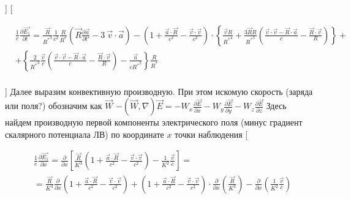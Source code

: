 \documentclass[11pt]{article}
\begin{document}
{]} {[}

\begin{align}
  & \frac{1}{e}\frac{\partial \overrightarrow{{{E}_{1}}}}{\partial t}=\frac{\overrightarrow{R}}{{{R}^{*}}^{3}}\frac{1}{{{c}^{2}}}\frac{R}{{{R}^{*}}}\left( \overrightarrow{R}\frac{\partial \overrightarrow{a}}{\partial t'}-3\ \overrightarrow{v}\cdot \overrightarrow{a} \right)-\left( 1+\frac{\overrightarrow{a}\cdot \overrightarrow{R}}{{{c}^{2}}}-\frac{\overrightarrow{v}\cdot \overrightarrow{v}}{{{c}^{2}}} \right)\cdot \left\{ \frac{\overrightarrow{v}R}{{{R}^{*}}^{4}}+\frac{3\overrightarrow{R}R}{{{R}^{*}}^{5}}\left( \frac{\overrightarrow{v}\cdot \overrightarrow{v}-\overrightarrow{R}\cdot \overrightarrow{a}}{c}-\frac{\overrightarrow{R}\cdot \overrightarrow{v}}{R} \right) \right\}+ \\ 
 & +\left\{ \frac{2}{{{R}^{*}}^{3}}\frac{\overrightarrow{v}}{c}\left( \frac{\overrightarrow{v}\cdot \overrightarrow{v}-\overrightarrow{R}\cdot \overrightarrow{a}}{c}-\frac{\overrightarrow{R}\cdot \overrightarrow{v}}{R} \right)-\frac{\overrightarrow{a}}{c{{R}^{*}}^{2}} \right\}\frac{R}{{{R}^{*}}} \\ 
\end{align}

{]} Далее выразим конвективную производную. При этом искомую скорость
(заряда или поля?) обозначим как \(\overrightarrow{W}\)
\(-\left( \overrightarrow{W},\nabla \right)\overrightarrow{E}=-{{W}_{x}}\frac{\partial \overrightarrow{E}}{\partial x}-{{W}_{y}}\frac{\partial \overrightarrow{E}}{\partial y}-{{W}_{z}}\frac{\partial \overrightarrow{E}}{\partial z}\)
Здесь найдем производную первой компоненты электрического поля (минус
градиент скалярного потенциала ЛВ) по координате \(x\) точки наблюдения
{[}

\begin{align}
  & \frac{1}{e}\frac{\partial \overrightarrow{{{E}_{1}}}}{\partial x}=\frac{\partial }{\partial x}\left[ \frac{\overrightarrow{R}}{{{K}^{3}}}\left( 1+\frac{\overrightarrow{a}\cdot \overrightarrow{R}}{{{c}^{2}}}-\frac{\overrightarrow{v}\cdot \overrightarrow{v}}{{{c}^{2}}} \right)-\frac{1}{{{K}^{2}}}\frac{\overrightarrow{v}}{c} \right]= \\ 
 & =\frac{\overrightarrow{R}}{{{K}^{3}}}\frac{\partial }{\partial x}\left( 1+\frac{\overrightarrow{a}\cdot \overrightarrow{R}}{{{c}^{2}}}-\frac{\overrightarrow{v}\cdot \overrightarrow{v}}{{{c}^{2}}} \right)+\left( 1+\frac{\overrightarrow{a}\cdot \overrightarrow{R}}{{{c}^{2}}}-\frac{\overrightarrow{v}\cdot \overrightarrow{v}}{{{c}^{2}}} \right)\cdot \frac{\partial }{\partial x}\left( \frac{\overrightarrow{R}}{{{K}^{3}}} \right)-\frac{\partial }{\partial x}\left( \frac{1}{{{K}^{2}}}\frac{\overrightarrow{v}}{c} \right) \\ 
\end{align}
\end{document}

